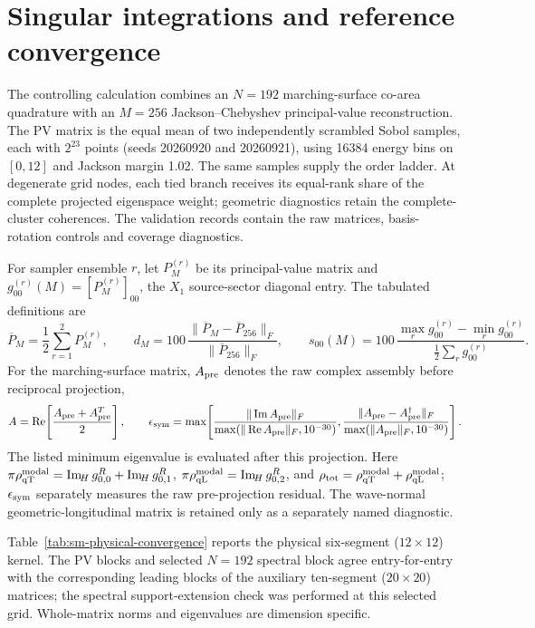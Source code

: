 \documentclass[10pt,aps,pre,onecolumn,notitlepage,nofootinbib]{revtex4-2}
\newcommand{\qT}{\mathrm{qT}}
\newcommand{\qL}{\mathrm{qL}}
\newcommand{\ImH}{\operatorname{Im}_{\!H}}
\begin{document}
\section{Singular integrations and reference convergence}

The controlling calculation combines an $N=192$ marching-surface co-area quadrature with an $M=256$ Jackson--Chebyshev principal-value reconstruction. The PV matrix is the equal mean of two independently scrambled Sobol samples, each with $2^{23}$ points (seeds 20260920 and 20260921), using 16384 energy bins on $[0,12]$ and Jackson margin 1.02. The same samples supply the order ladder. At degenerate grid nodes, each tied branch receives its equal-rank share of the complete projected eigenspace weight; geometric diagnostics retain the complete-cluster coherences. The validation records contain the raw matrices, basis-rotation controls and coverage diagnostics.

For sampler ensemble $r$, let $P_M^{(r)}$ be its principal-value matrix and $g_{00}^{(r)}(M)=[P_M^{(r)}]_{00}$, the $X_1$ source-sector diagonal entry. The tabulated definitions are
\begin{equation}
 \overline P_M=\frac12\sum_{r=1}^{2}P_M^{(r)},\qquad
 d_M=100\,\frac{\|\overline P_M-\overline P_{256}\|_F}{\|\overline P_{256}\|_F},\qquad
 s_{00}(M)=100\,\frac{\max_r g_{00}^{(r)}-\min_r g_{00}^{(r)}}{\frac12\sum_r g_{00}^{(r)}} .
\end{equation}
For the marching-surface matrix, $A_{\rm pre}$ denotes the raw complex assembly before reciprocal projection,
\begin{equation}
 A=\operatorname{Re}\!\left[\frac{A_{\rm pre}+A_{\rm pre}^{T}}2\right],\qquad
 \epsilon_{\rm sym}=\max\!\left[
 \frac{\|\operatorname{Im}A_{\rm pre}\|_F}{\max(\|\operatorname{Re}A_{\rm pre}\|_F,10^{-30})},
 \frac{\|A_{\rm pre}-A_{\rm pre}^{\dagger}\|_F}{\max(\|A_{\rm pre}\|_F,10^{-30})}
 \right].
\end{equation}
The listed minimum eigenvalue is evaluated after this projection. Here $\pi\rho_{\qT}^{\rm modal}=\ImH g_{0,0}^R+\ImH g_{0,1}^R$, $\pi\rho_{\qL}^{\rm modal}=\ImH g_{0,2}^R$, and $\rho_{\rm tot}=\rho_{\qT}^{\rm modal}+\rho_{\qL}^{\rm modal}$; $\epsilon_{\rm sym}$ separately measures the raw pre-projection residual. The wave-normal geometric-longitudinal matrix is retained only as a separately named diagnostic.

Table~\ref{tab:sm-physical-convergence} reports the physical six-segment ($12\times12$) kernel. The PV blocks and selected $N=192$ spectral block agree entry-for-entry with the corresponding leading blocks of the auxiliary ten-segment ($20\times20$) matrices; the spectral support-extension check was performed at this selected grid. Whole-matrix norms and eigenvalues are dimension specific.
\end{document}
